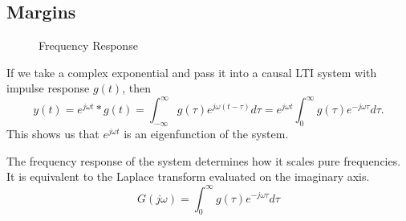 \subsection{Margins}
\begin{gitbook-image}
\begin{figure}[H]
    \centering 
    \caption{Frequency Response}
    \label{fig:frequency-response}
\end{figure}
\end{gitbook-image}
If we take a complex exponential and pass it into a causal LTI system with impulse response $g(t)$, then
\[
  y(t) = e^{j\omega t} * g(t) = \int_{-\infty}^{\infty}g(\tau)e^{j\omega(t-\tau)}d\tau = e^{j\omega t} \int_{0}^{\infty}g(\tau)e^{-j\omega \tau}d\tau.
\]
This shows us that $e^{j\omega t}$ is an eigenfunction of the system.
\begin{definition}
  The frequency response of the system determines how it scales pure frequencies. It is equivalent to the Laplace transform evaluated on the imaginary axis.
  \begin{equation}
	G(j\omega) = \int_0^{\infty}g(\tau)e^{-j\omega\tau}d\tau
	\label{eqn:frequency-response}
  \end{equation}
  \label{defn:frequency-response}
\end{definition}

